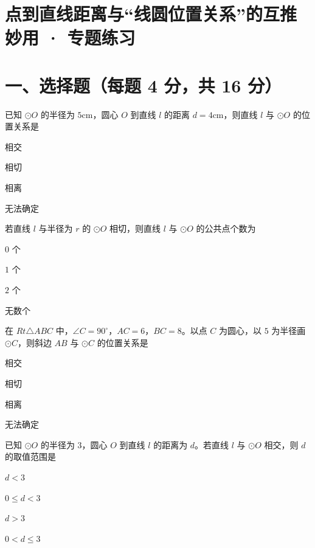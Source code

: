 \documentclass{exam-zh}
\begin{document}
\section*{点到直线距离与“线圆位置关系”的互推妙用 · 专题练习}

\section*{一、选择题（每题 4 分，共 16 分）}


\begin{question}[points=4]
  已知 $\odot O$ 的半径为 $5\text{cm}$，圆心 $O$ 到直线 $l$ 的距离 $d = 4\text{cm}$，则直线 $l$ 与 $\odot O$ 的位置关系是
  \begin{choices}
    \item 相交
    \item 相切
    \item 相离
    \item 无法确定
  \end{choices}
\end{question}



\begin{question}[points=4]
  若直线 $l$ 与半径为 $r$ 的 $\odot O$ 相切，则直线 $l$ 与 $\odot O$ 的公共点个数为
  \begin{choices}
    \item $0$ 个
    \item $1$ 个
    \item $2$ 个
    \item 无数个
  \end{choices}
\end{question}



\begin{question}[points=4]
  在 $Rt\triangle ABC$ 中，$\angle C = 90^\circ$，$AC = 6$，$BC = 8$。以点 $C$ 为圆心，以 $5$ 为半径画 $\odot C$，则斜边 $AB$ 与 $\odot C$ 的位置关系是
  \begin{choices}
    \item 相交
    \item 相切
    \item 相离
    \item 无法确定
  \end{choices}
\end{question}



\begin{question}[points=4]
  已知 $\odot O$ 的半径为 $3$，圆心 $O$ 到直线 $l$ 的距离为 $d$。若直线 $l$ 与 $\odot O$ 相交，则 $d$ 的取值范围是
  \begin{choices}
    \item $d < 3$
    \item $0 \le d < 3$
    \item $d > 3$
    \item $0 < d \le 3$
  \end{choices}
\end{question}
\end{document}
